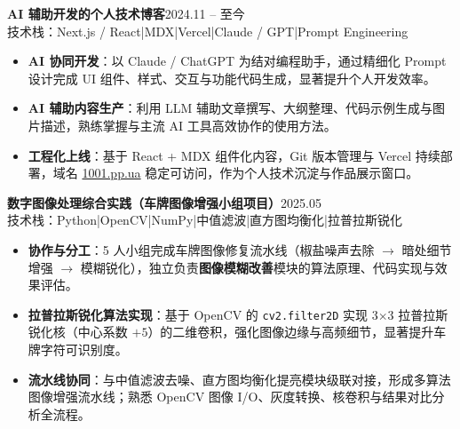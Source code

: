 \documentclass[10pt,a4paper]{article}
\newcommand{\projectblock}[3]{%
    {\bfseries\color{darktext}#1}\hfill{\color{graytext}#2}\\%
    {\small\color{graytext}#3}%
    \vspace{0.2em}%
}
\begin{document}
\vspace{0.15em}

\projectblock{AI 辅助开发的个人技术博客}{2024.11 -- 至今}{技术栈：Next.js / React\hspace{0.3em}|\hspace{0.3em}MDX\hspace{0.3em}|\hspace{0.3em}Vercel\hspace{0.3em}|\hspace{0.3em}Claude / GPT\hspace{0.3em}|\hspace{0.3em}Prompt Engineering}

\begin{itemize}[leftmargin=1.5em, itemsep=2pt, parsep=0pt, topsep=2pt]
    \item \textbf{AI 协同开发}：以 Claude / ChatGPT 为结对编程助手，通过精细化 Prompt 设计完成 UI 组件、样式、交互与功能代码生成，显著提升个人开发效率。
    \item \textbf{AI 辅助内容生产}：利用 LLM 辅助文章撰写、大纲整理、代码示例生成与图片描述，熟练掌握与主流 AI 工具高效协作的使用方法。
    \item \textbf{工程化上线}：基于 React + MDX 组件化内容，Git 版本管理与 Vercel 持续部署，域名 \href{https://1001.pp.ua}{1001.pp.ua} 稳定可访问，作为个人技术沉淀与作品展示窗口。
\end{itemize}

\vspace{0.15em}

\projectblock{数字图像处理综合实践（车牌图像增强小组项目）}{2025.05}{技术栈：Python\hspace{0.3em}|\hspace{0.3em}OpenCV\hspace{0.3em}|\hspace{0.3em}NumPy\hspace{0.3em}|\hspace{0.3em}中值滤波\hspace{0.3em}|\hspace{0.3em}直方图均衡化\hspace{0.3em}|\hspace{0.3em}拉普拉斯锐化}

\begin{itemize}[leftmargin=1.5em, itemsep=2pt, parsep=0pt, topsep=2pt]
    \item \textbf{协作与分工}：5 人小组完成车牌图像修复流水线（椒盐噪声去除 $\to$ 暗处细节增强 $\to$ 模糊锐化），独立负责\textbf{图像模糊改善}模块的算法原理、代码实现与效果评估。
    \item \textbf{拉普拉斯锐化算法实现}：基于 OpenCV 的 \texttt{cv2.filter2D} 实现 3$\times$3 拉普拉斯锐化核（中心系数 $+5$）的二维卷积，强化图像边缘与高频细节，显著提升车牌字符可识别度。
    \item \textbf{流水线协同}：与中值滤波去噪、直方图均衡化提亮模块级联对接，形成多算法图像增强流水线；熟悉 OpenCV 图像 I/O、灰度转换、核卷积与结果对比分析全流程。
\end{itemize}
\end{document}
